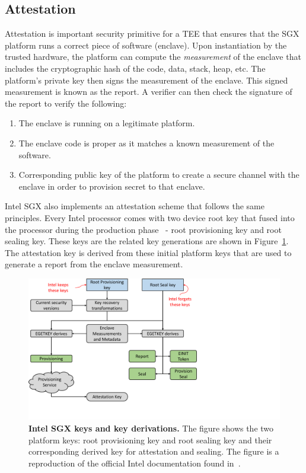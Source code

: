 \subsection{Attestation}
\label{ch:background:SGX:attestation}

Attestation is important security primitive for a TEE that ensures that the SGX platform runs a correct piece of software (enclave). Upon instantiation by the trusted hardware, the platform can compute the \emph{measurement} of the enclave that includes the cryptographic hash of the code, data, stack, heap, etc. The platform's private key then signs the measurement of the enclave. This signed measurement is known as the report. A verifier can then check the signature of the report to verify the following:

\begin{enumerate}
  \item The enclave is running on a legitimate platform.
  \item The enclave code is proper as it matches a known measurement of the software.
  \item Corresponding public key of the platform to create a secure channel with the enclave in order to provision secret to that enclave.
\end{enumerate}  

Intel SGX also implements an attestation scheme that follows the same principles. Every Intel processor comes with two device root key that fused into the processor during the production phase~\cite{attestation_primitive} -  root provisioning key and root sealing key. These keys are the related key generations are shown in Figure~\ref{fig:keys_bg}. The attestation key is derived from these initial platform keys that are used to generate a report from the enclave measurement.


\begin{figure}[t]
  \centering
    \includegraphics[trim={0 1cm 10cm 0},clip,width=0.9\linewidth]{chapters/background/figures/keys.pdf}
    \caption[Intel SGX keys and key derivations]{\textbf{Intel SGX keys and key derivations.} The figure shows the two platform keys: root provisioning key and root sealing key and their corresponding derived key for attestation and sealing. The figure is a reproduction of the official Intel documentation found in~\cite{attestation_primitive}.}
    \label{fig:keys_bg}
\end{figure}


